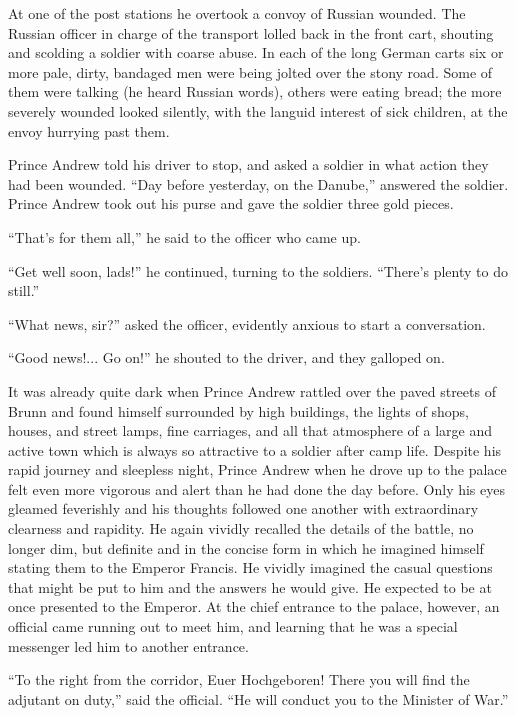 At one of the post stations he overtook a convoy of Russian
wounded. The Russian officer in charge of the transport lolled
back in the front cart, shouting and scolding a soldier with
coarse abuse. In each of the long German carts six or more pale,
dirty, bandaged men were being jolted over the stony road. Some
of them were talking (he heard Russian words), others were eating
bread; the more severely wounded looked silently, with the
languid interest of sick children, at the envoy hurrying past
them.

Prince Andrew told his driver to stop, and asked a soldier in
what action they had been wounded. ``Day before yesterday, on the
Danube,'' answered the soldier. Prince Andrew took out his purse
and gave the soldier three gold pieces.

``That's for them all,'' he said to the officer who came up.

``Get well soon, lads!'' he continued, turning to the
soldiers. ``There's plenty to do still.''

``What news, sir?'' asked the officer, evidently anxious to start
a conversation.

``Good news!... Go on!'' he shouted to the driver, and they
galloped on.

It was already quite dark when Prince Andrew rattled over the
paved streets of Brunn and found himself surrounded by high
buildings, the lights of shops, houses, and street lamps, fine
carriages, and all that atmosphere of a large and active town
which is always so attractive to a soldier after camp
life. Despite his rapid journey and sleepless night, Prince
Andrew when he drove up to the palace felt even more vigorous and
alert than he had done the day before. Only his eyes gleamed
feverishly and his thoughts followed one another with
extraordinary clearness and rapidity. He again vividly recalled
the details of the battle, no longer dim, but definite and in the
concise form in which he imagined himself stating them to the
Emperor Francis. He vividly imagined the casual questions that
might be put to him and the answers he would give. He expected to
be at once presented to the Emperor. At the chief entrance to the
palace, however, an official came running out to meet him, and
learning that he was a special messenger led him to another
entrance.

``To the right from the corridor, Euer Hochgeboren! There you
will find the adjutant on duty,'' said the official. ``He will
conduct you to the Minister of War.''

